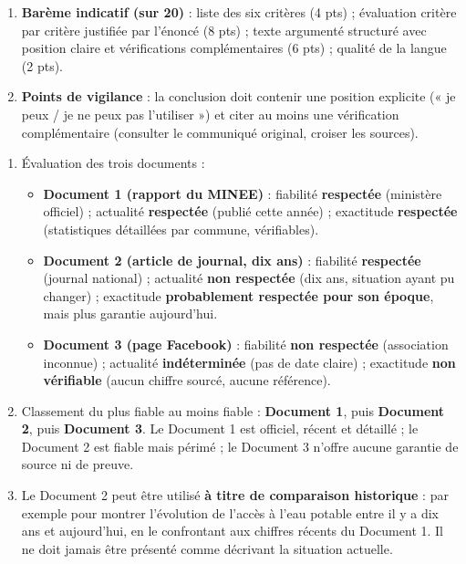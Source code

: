 \documentclass[11pt]{article}
\newcommand{\cle}[1]{{\popxbold\color{popdark}#1}}
\begin{document}
\begin{corrige}
\begin{enumerate}
\item[] \textbf{Barème indicatif (sur 20)} : liste des six critères (4 pts) ; évaluation critère par critère justifiée par l'énoncé (8 pts) ; texte argumenté structuré avec position claire et vérifications complémentaires (6 pts) ; qualité de la langue (2 pts).
\item[] \textbf{Points de vigilance} : la conclusion doit contenir une position explicite (« je peux / je ne peux pas l'utiliser ») et citer au moins une vérification complémentaire (consulter le communiqué original, croiser les sources).
\end{enumerate}
\end{corrige}

\begin{corrige}
\begin{enumerate}
\item Évaluation des trois documents :
\begin{itemize}
\item \textbf{Document 1 (rapport du MINEE)} : \cle{fiabilité} \textbf{respectée} (ministère officiel) ; \cle{actualité} \textbf{respectée} (publié cette année) ; \cle{exactitude} \textbf{respectée} (statistiques détaillées par commune, vérifiables).
\item \textbf{Document 2 (article de journal, dix ans)} : \cle{fiabilité} \textbf{respectée} (journal national) ; \cle{actualité} \textbf{non respectée} (dix ans, situation ayant pu changer) ; \cle{exactitude} \textbf{probablement respectée pour son époque}, mais plus garantie aujourd'hui.
\item \textbf{Document 3 (page Facebook)} : \cle{fiabilité} \textbf{non respectée} (association inconnue) ; \cle{actualité} \textbf{indéterminée} (pas de date claire) ; \cle{exactitude} \textbf{non vérifiable} (aucun chiffre sourcé, aucune référence).
\end{itemize}
\item Classement du plus fiable au moins fiable : \textbf{Document 1}, puis \textbf{Document 2}, puis \textbf{Document 3}. Le Document 1 est officiel, récent et détaillé ; le Document 2 est fiable mais périmé ; le Document 3 n'offre aucune garantie de source ni de preuve.
\item Le Document 2 peut être utilisé \textbf{à titre de comparaison historique} : par exemple pour montrer l'évolution de l'accès à l'eau potable entre il y a dix ans et aujourd'hui, en le confrontant aux chiffres récents du Document 1. Il ne doit jamais être présenté comme décrivant la situation actuelle.

\end{enumerate}
\end{corrige}
\end{document}
